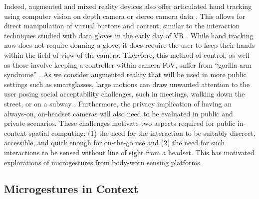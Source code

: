 \documentclass [11pt, proquest] {uwthesis}[2020/02/24]
\begin{document}
Indeed, augmented and mixed reality devices also offer articulated hand tracking using computer vision on depth camera or stereo camera data \cite{microsoft, MetaStore, TrackingUltraleap}. This allows for direct manipulation of virtual buttons and content, similar to the interaction techniques studied with data gloves in the early day of VR \cite{zimmerman1986hand}. While hand tracking now does not require donning a glove, it does require the user to keep their hands within the field-of-view of the camera. Therefore, this method of control, as well as those involve keeping a controller within camera FoV, suffer from ``gorilla arm syndrome'' \cite{boring2009scroll}. As we consider augmented reality that will be used in more public settings such as smartglasses, large motions can draw unwanted attention to the user posing social acceptability challenges, such in meetings, walking down the street, or on a subway \cite{rico2010usable}. Furthermore, the privacy implication of having an always-on, on-headset cameras will also need to be evaluated in public and private scenarios. These challenges motivate two aspects required for public in-context spatial computing: (1) the need for the interaction to be suitably discreet, accessible, and quick enough for on-the-go use and (2) the need for such interactions to be sensed without line of sight from a headset. This has motivated explorations of microgestures from body-worn sensing platforms.   %



\subsection{Microgestures in Context}
\end{document}

